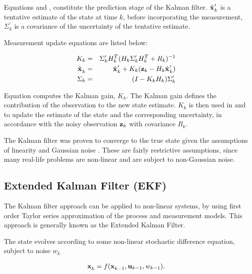 Equations  and
, constitute the prediction stage of the
Kalman filter. $\hat{\x{}{}{}}_k^\prime$ is a tentative estimate of
the state at time $k$, before incorporating the measurement,
$\Sigma_k^\prime$ is a covariance of the uncertainty of the tentative
estimate.

Measurement update equations are listed below:

\begin{eqnarray}
\label{eqn:kalman_gain}
K_k &=& \Sigma_k^\prime H_k^T (H_k \Sigma_k^\prime H_k^T + R_k )^{-1}\\
\label{eqn:kalman_x_obs}
\hat{\x{}{}{}}_k &=& \hat{\x{}{}{}}_k^\prime + 
                      K_k (\z{k} - H_k \hat{\x{}{}{}}_k^\prime)\\
\label{eqn:kalman_sigma_obs}
\Sigma_k &=& (I - K_k H_k) \Sigma_k^\prime
\end{eqnarray}

Equation  computes the Kalman gain,
$K_k$. The Kalman gain defines the contribution of the observation to
the new state estimate. $K_k$ is then used in
 and  
to update the estimate of the state and the corresponding uncertainty,
in accordance with the noisy observation ${\bf z}_{k}$ with covariance
$R_k$.

The Kalman filter was proven to converge to the true state given the
assumptions of linearity and Gaussian noise \cite{kalman60}. These are
fairly restrictive assumptions, since many real-life problems
are non-linear and are subject to non-Gaussian noise.

\subsection{Extended Kalman Filter (EKF)}
\label{sec:EKF}

The Kalman filter approach can be applied to non-linear systems, by
using first order Taylor series approximation of the process and
measurement models. This approach is generally known as the Extended
Kalman Filter.

The state  evolves according to some non-linear stochastic
difference equation, subject to noise $w_{k}$

\begin{equation}
   \x{k}{}{} = f (\x{k-1}{}{}, \U{k-1}, w_{k-1}).
\label{eqn:ekf_process}
\end{equation}

